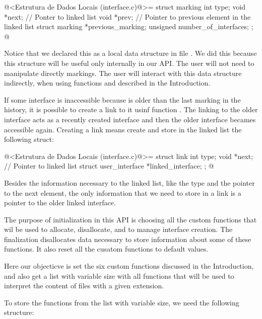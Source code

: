 \iniciocodigo
@<Estrutura de Dados Locais (interface.c)@>=
struct marking {
  int type;
  void *next; // Ponter to linked list
  void *prev; // Pointer to previous element in the linked list
  struct marking *previous_marking;
  unsigned number_of_interfaces;
};
@
\fimcodigo

Notice that we declared this as a local data structure in file
. We did this because this structure will be
useful only internally in our API. The user will not need to
manipulate directly markings. The user will interact with this data
structure indirectly, when using functions
 and
 described in the
Introduction.


If some interface is inaccessible because is older than the last
marking in the history, it is possible to create a link to it usinf
function . The linking to the older
interface acts as a recently created interface and then the older
interface becames accessible again. Creating a link means create and
store in the linked list the following struct:

\iniciocodigo
@<Estrutura de Dados Locais (interface.c)@>=
struct link{
  int type;
  void *next; // Pointer to linked list
  struct user_interface *linked_interface;
};
@
\fimcodigo

Besides the information necessary to the linked list, like the type
and the pointer to the next element, the only information that we need
to store in a link is a pointer to the older linked interface.


The purpose of initialization in this API is choosing all the custom
functions that wil be used to allocate, disallocate, and to manage
interface creation. The finalization disallocates data necessary to
store information about some of these functions. It also reset all the
cusatom functions to default values.


Here our objecticve is set the six custom functions discussed in the
Introduction, and also get a list with variable size with all
functions that will be used to interpret the content of files with a
given extension.

To store the functions from the list with variable size, we need the
following structure:

